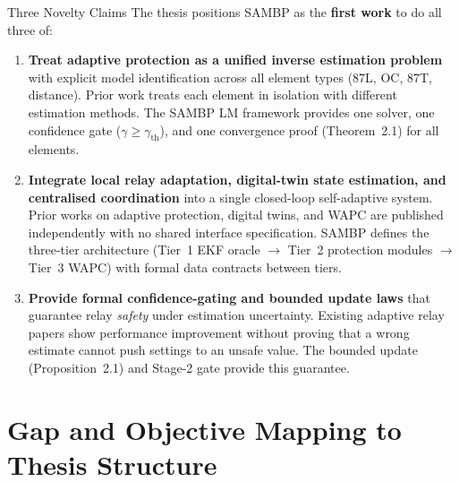\documentclass[12pt,a4paper]{article}
\newcommand{\gammath}{\gamma_\mathrm{th}}
\begin{document}
\begin{resultbox}{Three Novelty Claims}
The thesis positions SAMBP as the \textbf{first work} to do all three of:

\begin{enumerate}[nosep]
  \item \textbf{Treat adaptive protection as a unified inverse estimation problem}
        with explicit model identification across all element types (87L, OC, 87T,
        distance).  Prior work treats each element in isolation with different
        estimation methods.  The SAMBP LM framework provides one solver,
        one confidence gate ($\gamma \geq \gammath$), and one convergence proof
        (Theorem~2.1) for all elements.

  \item \textbf{Integrate local relay adaptation, digital-twin state estimation,
        and centralised coordination} into a single closed-loop self-adaptive system.
        Prior works on adaptive protection, digital twins, and WAPC are published
        independently with no shared interface specification.  SAMBP defines the
        three-tier architecture (Tier~1 EKF oracle $\to$ Tier~2 protection
        modules $\to$ Tier~3 WAPC) with formal data contracts between tiers.

  \item \textbf{Provide formal confidence-gating and bounded update laws} that
        guarantee relay \emph{safety} under estimation uncertainty.  Existing
        adaptive relay papers show performance improvement without proving that a
        wrong estimate cannot push settings to an unsafe value.  The bounded update
        (Proposition~2.1) and Stage-2 gate provide this guarantee.
\end{enumerate}
\end{resultbox}

\section{Gap and Objective Mapping to Thesis Structure}
\end{document}
